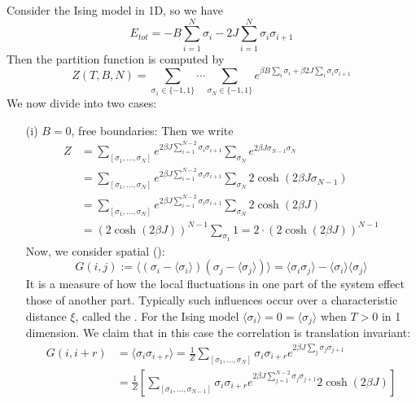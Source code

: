 \documentclass[12pt, a4paper, oneside, openright, titlepage]{book}
\begin{document}
\begin{eg}
    Consider the Ising model in 1D, so we have $$E_{tot} = -B\sum_{i=1}^N\sigma_i-2J\sum_{i=1}^N\sigma_i\sigma_{i+1}$$
    Then the partition function is computed by $$Z(T,B,N) = \sum_{\sigma_1 \in \{-1,1\}}\cdots\sum_{\sigma_N\in\{-1,1\}}e^{\beta B\sum_i\sigma_i+\beta 2J\sum_{i}\sigma_i\sigma_{i+1}}$$
    We now divide into two cases: \begin{itemize}
        \item[(i)] $B = 0$, free boundaries: Then we write \begin{align*}
                Z &= \sum_{[\sigma_1,...,\sigma_N]}e^{2\beta J\sum_{i=1}^{N-2}\sigma_i\sigma_{i+1}}\sum_{\sigma_N}e^{2\beta J\sigma_{N-1}\sigma_N} \\
                &= \sum_{[\sigma_1,...,\sigma_N]}e^{2\beta J\sum_{i=1}^{N-2}\sigma_i\sigma_{i+1}}\sum_{\sigma_N}2\cosh(2\beta J\sigma_{N-1}) \\
                &= \sum_{[\sigma_1,...,\sigma_N]}e^{2\beta J\sum_{i=1}^{N-2}\sigma_i\sigma_{i+1}}\sum_{\sigma_N}2\cosh(2\beta J) \\
                &= (2\cosh(2\beta J))^{N-1}\sum_{\sigma_1}1 = 2\cdot(2\cosh(2\beta J))^{N-1}
        \end{align*}
            Now, we consider spatial  (): \begin{equation*}
                G(i,j) := \langle (\sigma_i-\langle \sigma_i\rangle)(\sigma_j-\langle\sigma_j\rangle)\rangle = \langle \sigma_i\sigma_j\rangle - \langle \sigma_i\rangle\langle \sigma_j\rangle
            \end{equation*}
            It is a measure of how the local fluctuations in one part of the system effect those of another part. Typically such influences occur over a characteristic distance $\xi$, called the .
            For the Ising model $\langle \sigma_i \rangle = 0 = \langle \sigma_j\rangle$ when $T > 0$ in 1 dimension. We claim that in this case the correlation is translation invariant: \begin{align*}
                G(i,i+r) &= \langle \sigma_i\sigma_{i+r}\rangle = \frac{1}{Z}\sum_{[\sigma_1,...,\sigma_N]}\sigma_i\sigma_{i+r}e^{2\beta J\sum_{j}\sigma_j\sigma_{j+1}} \\
                &= \frac{1}{Z}\left[\sum_{[\sigma_1,...,\sigma_{N-1}]}\sigma_i\sigma_{i+r}e^{2\beta J\sum_{j=1}^{N-2}\sigma_j\sigma_{j+1}}2\cosh(2\beta J)\right] \\

\end{align*}
\end{itemize}
\end{eg}
\end{document}

